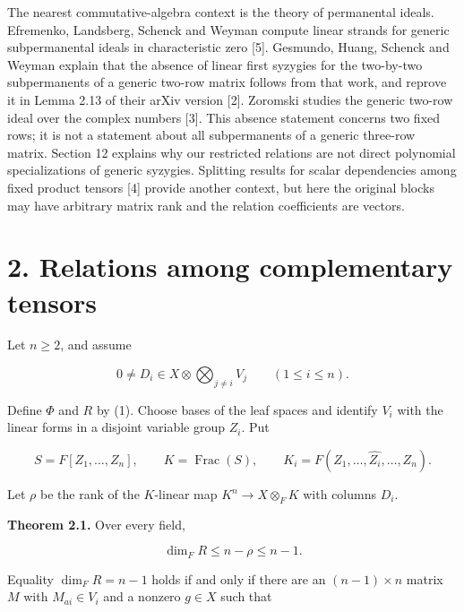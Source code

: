 \documentclass[11pt]{article}
\begin{document}
The nearest commutative-algebra context is the theory of permanental ideals. Efremenko, Landsberg, Schenck and Weyman compute linear strands for generic subpermanental ideals in characteristic zero [5]. Gesmundo, Huang, Schenck and Weyman explain that the absence of linear first syzygies for the two-by-two subpermanents of a generic two-row matrix follows from that work, and reprove it in Lemma 2.13 of their arXiv version [2]. Zoromski studies the generic two-row ideal over the complex numbers [3]. This absence statement concerns two fixed rows; it is not a statement about all subpermanents of a generic three-row matrix. Section 12 explains why our restricted relations are not direct polynomial specializations of generic syzygies. Splitting results for scalar dependencies among fixed product tensors [4] provide another context, but here the original blocks may have arbitrary matrix rank and the relation coefficients are vectors.


\section*{2. Relations among complementary tensors}

Let $n\geq2$, and assume


\nopagebreak[4]

\begin{equation}
0\ne D_i\in X\otimes\bigotimes_{j\ne i}V_j
\qquad(1\leq i\leq n).
\tag{3}
\end{equation}

Define $\Phi$ and $R$ by (1). Choose bases of the leaf spaces and identify $V_i$ with the linear forms in a disjoint variable group $Z_i$. Put


\nopagebreak[4]

\begin{equation}
S=F[Z_1,\ldots,Z_n],\qquad K=\operatorname{Frac}(S),\qquad
K_i=F(Z_1,\ldots,\widehat{Z_i},\ldots,Z_n).
\tag{4}
\end{equation}

Let $\rho$ be the rank of the $K$-linear map $K^n\to X\otimes_F K$ with columns $D_i$.


\textbf{Theorem 2.1.} Over every field,


\nopagebreak[4]

\begin{equation}
\dim_F R\leq n-\rho\leq n-1.
\tag{5}
\end{equation}

Equality $\dim_F R=n-1$ holds if and only if there are an $(n-1)\times n$ matrix $M$ with $M_{ai}\in V_i$ and a nonzero $g\in X$ such that
\end{document}
